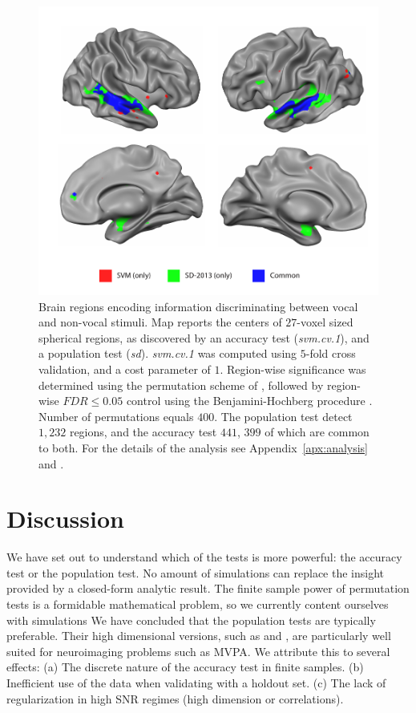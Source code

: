 \documentclass[12pt,a4paper]{article}
\theoremstyle{definition}
\begin{document}
\begin{figure}[th]
\centering
\includegraphics[width=0.7\linewidth]{"art/svm_vs_SD"}
\caption{\footnotesize
Brain regions encoding information discriminating between vocal and non-vocal stimuli.
Map reports the centers of $27$-voxel sized spherical regions, as discovered by an accuracy test (\emph{svm.cv.1}), and a population test (\emph{sd}). 
\emph{svm.cv.1} was computed using $5$-fold cross validation, and a cost parameter of $1$. 
Region-wise significance was determined using the permutation scheme of \cite{stelzer_statistical_2013}, followed by region-wise $FDR \leq 0.05$ control using the Benjamini-Hochberg procedure \citep{benjamini_controlling_1995}.
Number of permutations equals $400$.
The population test detect $1,232$ regions, and the accuracy test $441$, $399$ of which are common to both.
For the details of the analysis see Appendix~\ref{apx:analysis} and \cite{gilron_quantifying_2016}.  
  }
\label{fig:read_data}
\end{figure}








\section{Discussion}
\label{sec:discussion}

We have set out to understand which of the tests is more powerful: the accuracy test or the population test. 
No amount of simulations can replace the insight provided by a closed-form analytic result. 
The finite sample power of permutation tests is a formidable mathematical problem, so we currently content ourselves with simulations 
We have concluded that the population tests are typically preferable. 
Their high dimensional versions, such as \cite{srivastava_multivariate_2007} and \cite{schafer_shrinkage_2005},  are particularly well suited for neuroimaging problems such as MVPA.
We attribute this to several effects: \newline
(a) The discrete nature of the accuracy test in finite samples. \newline
(b) Inefficient use of the data when validating with a holdout set. \newline
(c) The lack of regularization in high SNR regimes (high dimension or correlations). \newline
\end{document}
